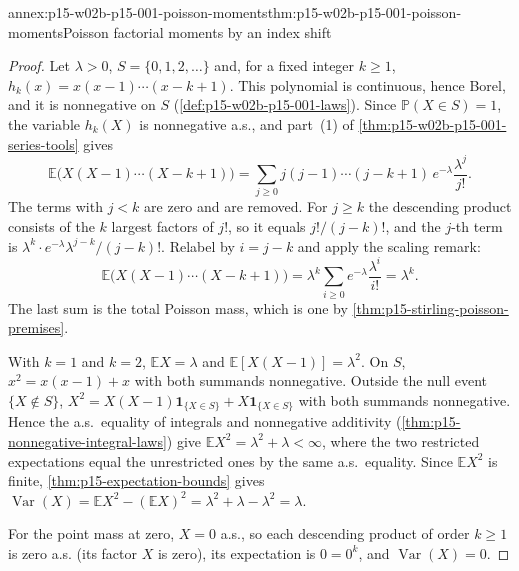 \begin{annexitem}{annex:p15-w02b-p15-001-poisson-moments}{thm:p15-w02b-p15-001-poisson-moments}{Poisson factorial moments by an index shift}
\begin{proof}
Let \(\lambda>0\), \(S=\{0,1,2,\ldots\}\) and, for a fixed integer
\(k\geq1\), \(h_k(x)=x(x-1)\cdots(x-k+1)\). This polynomial is
continuous, hence Borel, and it is nonnegative on \(S\)
(\cref{def:p15-w02b-p15-001-laws}). Since
\(\mathbb P(X\in S)=1\), the variable \(h_k(X)\) is nonnegative a.s.,
and part~(1) of \cref{thm:p15-w02b-p15-001-series-tools} gives
\[
 \mathbb E\bigl(X(X-1)\cdots(X-k+1)\bigr)
 =\sum_{j\geq0}j(j-1)\cdots(j-k+1)\,e^{-\lambda}\frac{\lambda^j}{j!}.
\]
The terms with \(j<k\) are zero and are removed. For \(j\geq k\) the
descending product consists of the \(k\) largest factors of \(j!\), so
it equals \(j!/(j-k)!\), and the \(j\)-th term is
\(\lambda^k\cdot e^{-\lambda}\lambda^{j-k}/(j-k)!\). Relabel by
\(i=j-k\) and apply the scaling remark:
\[
 \mathbb E\bigl(X(X-1)\cdots(X-k+1)\bigr)
 =\lambda^k\sum_{i\geq0}e^{-\lambda}\frac{\lambda^i}{i!}=\lambda^k.
\]
The last sum is the total Poisson mass, which is one by
\cref{thm:p15-stirling-poisson-premises}.

With \(k=1\) and \(k=2\), \(\mathbb EX=\lambda\) and
\(\mathbb E[X(X-1)]=\lambda^2\). On \(S\), \(x^2=x(x-1)+x\) with
both summands nonnegative. Outside the null event \(\{X\notin S\}\),
\(X^2=X(X-1)\mathbf1_{\{X\in S\}}+X\mathbf1_{\{X\in S\}}\) with both
summands nonnegative. Hence the a.s.\ equality of integrals and
nonnegative additivity (\cref{thm:p15-nonnegative-integral-laws})
give \(\mathbb EX^2=\lambda^2+\lambda<\infty\), where the two
restricted expectations equal the unrestricted ones by the same
a.s.\ equality. Since \(\mathbb EX^2\) is finite,
\cref{thm:p15-expectation-bounds} gives
\(\operatorname{Var}(X)=\mathbb EX^2-(\mathbb EX)^2
 =\lambda^2+\lambda-\lambda^2=\lambda\).

For the point mass at zero, \(X=0\) a.s., so each descending product
of order \(k\geq1\) is zero a.s. (its factor \(X\) is zero), its
expectation is \(0=0^k\), and \(\operatorname{Var}(X)=0\).
\end{proof}
\end{annexitem}

